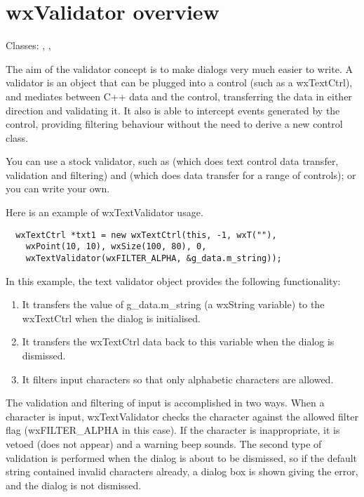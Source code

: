\section{wxValidator overview}\label{validatoroverview}

Classes: , , 

The aim of the validator concept is to make dialogs very much easier to write.
A validator is an object that can be plugged into a control (such as a wxTextCtrl), and
mediates between C++ data and the control, transferring the data in either direction
and validating it. It also is able to intercept events generated
by the control, providing filtering behaviour without the need to derive a new control class.

You can use a stock validator, such as  (which does text
control data transfer, validation and filtering) and 
 (which does data transfer for a range of controls);
or you can write your own.


Here is an example of wxTextValidator usage.

\begin{verbatim}
  wxTextCtrl *txt1 = new wxTextCtrl(this, -1, wxT(""),
    wxPoint(10, 10), wxSize(100, 80), 0,
    wxTextValidator(wxFILTER_ALPHA, &g_data.m_string));
\end{verbatim}

In this example, the text validator object provides the following functionality:

\begin{enumerate}\itemsep=0pt
\item It transfers the value of g\_data.m\_string (a wxString variable) to the wxTextCtrl when
the dialog is initialised.
\item It transfers the wxTextCtrl data back to this variable when the dialog is dismissed.
\item It filters input characters so that only alphabetic characters are allowed.
\end{enumerate}

The validation and filtering of input is accomplished in two ways. When a character is input,
wxTextValidator checks the character against the allowed filter flag (wxFILTER\_ALPHA in this case). If
the character is inappropriate, it is vetoed (does not appear) and a warning beep sounds.
The second type of validation is performed when the dialog is about to be dismissed, so if
the default string contained invalid characters already, a dialog box is shown giving the
error, and the dialog is not dismissed.

